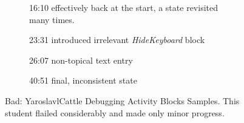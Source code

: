 \begin{figure}
\begin{subfigure}{.45\textwidth}
		\caption{16:10 effectively back at the start, a state revisited many times.} 
	\end{subfigure}\hfill
	\begin{subfigure}{.45\textwidth}
		\caption{23:31 introduced irrelevant \emph{HideKeyboard} block} 
	\end{subfigure}\hfill
	\begin{subfigure}{.45\textwidth}
		\caption{26:07 non-topical text entry} 
	\end{subfigure}\hfill
	\begin{subfigure}{.45\textwidth}
		\caption{40:51 final, inconsistent state} 
	\end{subfigure}

	\caption[Bad: YaroslavlCattle Debugging Activity Blocks Samples]{Bad: YaroslavlCattle Debugging Activity Blocks Samples. This student flailed considerably and made only minor progress.}
	\label{fig:YaroslavlCattle_blocks}
\end{figure}

